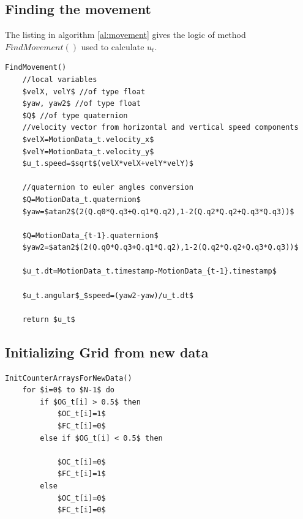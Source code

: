 

\subsection{Finding the movement}
The listing in algorithm \ref{al:movement} gives the logic of method $FindMovement()$ used to calculate $u_t$.
\begin{lstlisting}[label=al:movement,mathescape=true,caption={Find the movement of the vehicle}]
FindMovement()
	//local variables
	$velX, velY$ //of type float
	$yaw, yaw2$ //of type float
	$Q$ //of type quaternion
	//velocity vector from horizontal and vertical speed components
	$velX=MotionData_t.velocity_x$
	$velY=MotionData_t.velocity_y$
	$u_t.speed=$sqrt$(velX*velX+velY*velY)$
	
	//quaternion to euler angles conversion	
	$Q=MotionData_t.quaternion$
	$yaw=$atan2$(2(Q.q0*Q.q3+Q.q1*Q.q2),1-2(Q.q2*Q.q2+Q.q3*Q.q3))$	

	$Q=MotionData_{t-1}.quaternion$
	$yaw2=$atan2$(2(Q.q0*Q.q3+Q.q1*Q.q2),1-2(Q.q2*Q.q2+Q.q3*Q.q3))$	
	
	$u_t.dt=MotionData_t.timestamp-MotionData_{t-1}.timestamp$
	
	$u_t.angular$_$speed=(yaw2-yaw)/u_t.dt$
	
	return $u_t$
\end{lstlisting}


\subsection{Initializing Grid from new data}

\begin{lstlisting}[label=al:initializeGrid,mathescape=true,caption={Initialization of the grid}]
InitCounterArraysForNewData()
	for $i=0$ to $N-1$ do
		if $OG_t[i] > 0.5$ then 
			$OC_t[i]=1$
			$FC_t[i]=0$
		else if $OG_t[i] < 0.5$ then
		
			$OC_t[i]=0$
			$FC_t[i]=1$
		else
			$OC_t[i]=0$
			$FC_t[i]=0$
\end{lstlisting}

